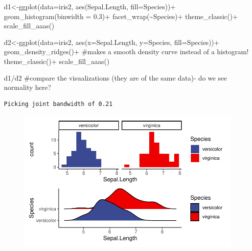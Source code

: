 \documentclass[
  letterpaper,
  DIV=11,
  numbers=noendperiod]{scrartcl}
\newenvironment{Shaded}{\begin{snugshade}}{\end{snugshade}}
\newcommand{\AttributeTok}[1]{\textcolor[rgb]{0.40,0.45,0.13}{#1}}
\newcommand{\CommentTok}[1]{\textcolor[rgb]{0.37,0.37,0.37}{#1}}
\newcommand{\FloatTok}[1]{\textcolor[rgb]{0.68,0.00,0.00}{#1}}
\newcommand{\FunctionTok}[1]{\textcolor[rgb]{0.28,0.35,0.67}{#1}}
\newcommand{\NormalTok}[1]{\textcolor[rgb]{0.00,0.23,0.31}{#1}}
\newcommand{\OtherTok}[1]{\textcolor[rgb]{0.00,0.23,0.31}{#1}}
\newcommand{\SpecialCharTok}[1]{\textcolor[rgb]{0.37,0.37,0.37}{#1}}
\begin{document}
\begin{Shaded}
\begin{Highlighting}[]
\NormalTok{d1}\OtherTok{\textless{}{-}}\FunctionTok{ggplot}\NormalTok{(}\AttributeTok{data=}\NormalTok{iris2, }\FunctionTok{aes}\NormalTok{(Sepal.Length, }\AttributeTok{fill=}\NormalTok{Species))}\SpecialCharTok{+}
  \FunctionTok{geom\_histogram}\NormalTok{(}\AttributeTok{binwidth =} \FloatTok{0.3}\NormalTok{)}\SpecialCharTok{+} 
  \FunctionTok{facet\_wrap}\NormalTok{(}\SpecialCharTok{\textasciitilde{}}\NormalTok{Species)}\SpecialCharTok{+}
  \FunctionTok{theme\_classic}\NormalTok{()}\SpecialCharTok{+}
  \FunctionTok{scale\_fill\_aaas}\NormalTok{()}

\NormalTok{d2}\OtherTok{\textless{}{-}}\FunctionTok{ggplot}\NormalTok{(}\AttributeTok{data=}\NormalTok{iris2, }\FunctionTok{aes}\NormalTok{(}\AttributeTok{x=}\NormalTok{Sepal.Length, }\AttributeTok{y=}\NormalTok{Species, }\AttributeTok{fill=}\NormalTok{Species))}\SpecialCharTok{+}
  \FunctionTok{geom\_density\_ridges}\NormalTok{()}\SpecialCharTok{+} \CommentTok{\#makes a smooth density curve instead of a histogram!}
  \FunctionTok{theme\_classic}\NormalTok{()}\SpecialCharTok{+}
  \FunctionTok{scale\_fill\_aaas}\NormalTok{()}

\NormalTok{d1}\SpecialCharTok{/}\NormalTok{d2 }\CommentTok{\#compare the visualizations (they are of the same data){-} do we see normality here?}
\end{Highlighting}
\end{Shaded}

\begin{verbatim}
Picking joint bandwidth of 0.21
\end{verbatim}

\begin{figure}[H]

{\centering \includegraphics{cor_reg_chi_files/figure-pdf/unnamed-chunk-26-1.pdf}

}

\end{figure}
\end{document}
